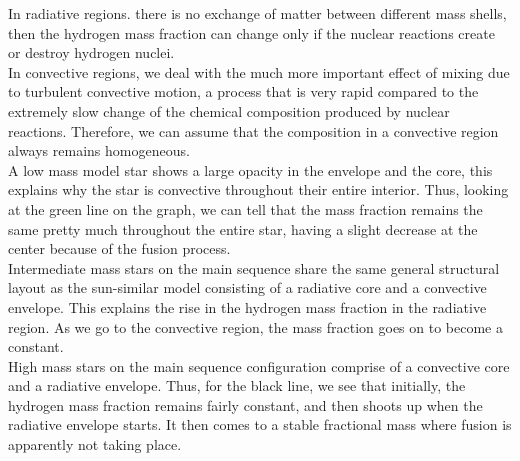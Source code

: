 \documentclass[10pt]{article}
\begin{document}
In radiative regions. there is no exchange of matter between different mass shells, then the hydrogen mass fraction can change only if the nuclear reactions create or destroy hydrogen nuclei. \\
In convective regions, we deal with the much more important effect of mixing due to turbulent convective motion, a process that is very rapid compared to the extremely slow change of the chemical composition produced by nuclear reactions. Therefore, we can assume that the composition in a convective region always remains homogeneous.\\
A low mass model star shows a large opacity in the envelope and the core, this explains why the star is convective throughout their entire interior. Thus, looking at the green line on the graph, we can tell that the mass fraction remains the same pretty much throughout the entire star, having a slight decrease at the center because of the fusion process.\\
Intermediate mass stars on the main sequence share the same general structural layout as the sun-similar model consisting of a radiative core and a convective envelope. This explains the rise in the hydrogen mass fraction in the radiative region. As we go to the convective region, the mass fraction goes on to become a constant. \\
High mass stars on the main sequence configuration comprise of a convective core and a radiative envelope. Thus, for the black line, we see that initially, the hydrogen mass fraction remains fairly constant, and then shoots up when the radiative envelope starts. It then comes to a stable fractional mass where fusion is apparently not taking place.
\end{document}
